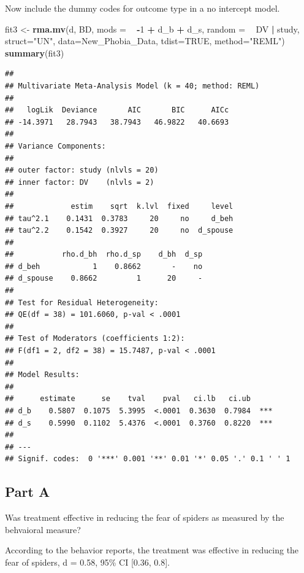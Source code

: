 \documentclass[]{article}
\newenvironment{Shaded}{\begin{snugshade}}{\end{snugshade}}
\newcommand{\KeywordTok}[1]{\textcolor[rgb]{0.13,0.29,0.53}{\textbf{#1}}}
\newcommand{\DataTypeTok}[1]{\textcolor[rgb]{0.13,0.29,0.53}{#1}}
\newcommand{\DecValTok}[1]{\textcolor[rgb]{0.00,0.00,0.81}{#1}}
\newcommand{\StringTok}[1]{\textcolor[rgb]{0.31,0.60,0.02}{#1}}
\newcommand{\OtherTok}[1]{\textcolor[rgb]{0.56,0.35,0.01}{#1}}
\newcommand{\OperatorTok}[1]{\textcolor[rgb]{0.81,0.36,0.00}{\textbf{#1}}}
\newcommand{\NormalTok}[1]{#1}
\begin{document}
Now include the dummy codes for outcome type in a no intercept model.

\begin{Shaded}
\begin{Highlighting}[]
\NormalTok{fit3 <-}\StringTok{ }\KeywordTok{rma.mv}\NormalTok{(d, BD, }\DataTypeTok{mods =} \OperatorTok{~}\StringTok{ }\OperatorTok{-}\DecValTok{1} \OperatorTok{+}\StringTok{ }\NormalTok{d_b }\OperatorTok{+}\StringTok{ }\NormalTok{d_s, }\DataTypeTok{random =} \OperatorTok{~}\StringTok{ }\NormalTok{DV }\OperatorTok{|}\StringTok{ }\NormalTok{study, }\DataTypeTok{struct=}\StringTok{"UN"}\NormalTok{, }\DataTypeTok{data=}\NormalTok{New_Phobia_Data, }\DataTypeTok{tdist=}\OtherTok{TRUE}\NormalTok{, }\DataTypeTok{method=}\StringTok{"REML"}\NormalTok{)}
\KeywordTok{summary}\NormalTok{(fit3)}
\end{Highlighting}
\end{Shaded}

\begin{verbatim}
## 
## Multivariate Meta-Analysis Model (k = 40; method: REML)
## 
##   logLik  Deviance       AIC       BIC      AICc 
## -14.3971   28.7943   38.7943   46.9822   40.6693   
## 
## Variance Components:
## 
## outer factor: study (nlvls = 20)
## inner factor: DV    (nlvls = 2)
## 
##             estim    sqrt  k.lvl  fixed     level 
## tau^2.1    0.1431  0.3783     20     no     d_beh 
## tau^2.2    0.1542  0.3927     20     no  d_spouse 
## 
##           rho.d_bh  rho.d_sp    d_bh  d_sp 
## d_beh            1    0.8662       -    no 
## d_spouse    0.8662         1      20     - 
## 
## Test for Residual Heterogeneity:
## QE(df = 38) = 101.6060, p-val < .0001
## 
## Test of Moderators (coefficients 1:2):
## F(df1 = 2, df2 = 38) = 15.7487, p-val < .0001
## 
## Model Results:
## 
##      estimate      se    tval    pval   ci.lb   ci.ub 
## d_b    0.5807  0.1075  5.3995  <.0001  0.3630  0.7984  *** 
## d_s    0.5990  0.1102  5.4376  <.0001  0.3760  0.8220  *** 
## 
## ---
## Signif. codes:  0 '***' 0.001 '**' 0.01 '*' 0.05 '.' 0.1 ' ' 1
\end{verbatim}

\subsection{Part A}\label{part-a-2}

Was treatment effective in reducing the fear of spiders as measured by
the behvaioral measure?

According to the behavior reports, the treatment was effective in
reducing the fear of spiders, d = 0.58, 95\% CI {[}0.36, 0.8{]}.
\end{document}
